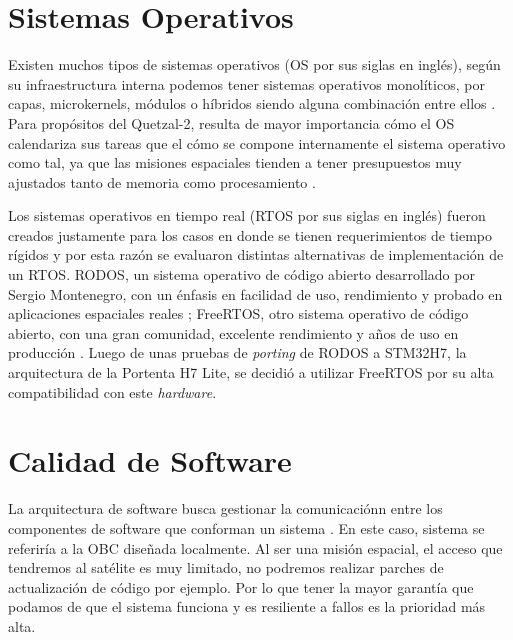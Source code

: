   \section{Sistemas Operativos}
  Existen muchos tipos de sistemas operativos (OS por sus siglas en inglés), según su infraestructura interna podemos tener sistemas operativos monolíticos, por capas, microkernels, módulos o híbridos siendo alguna combinación entre ellos \cite{operating_system_concepts_2018}. Para propósitos del Quetzal-2, resulta de mayor importancia cómo el OS calendariza sus tareas que el cómo se compone internamente el sistema operativo como tal, ya que las misiones espaciales tienden a tener presupuestos muy ajustados tanto de memoria como procesamiento \cite{lwabanji_wilkinson_biermann_bellville_2013}. 

  Los sistemas operativos en tiempo real (RTOS por sus siglas en inglés) fueron creados justamente para los casos en donde se tienen requerimientos de tiempo rígidos \cite{operating_system_concepts_2018} y por esta razón se evaluaron distintas alternativas de implementación de un RTOS. RODOS, un sistema operativo de código abierto desarrollado por Sergio Montenegro, con un énfasis en facilidad de uso, rendimiento y probado en aplicaciones espaciales reales \cite{rodos}; FreeRTOS, otro sistema operativo de código abierto, con una gran comunidad, excelente rendimiento y años de uso en producción \cite{freertos_2010}. Luego de unas pruebas de \textit{porting} de RODOS a STM32H7, la arquitectura de la Portenta H7 Lite, se decidió a utilizar FreeRTOS por su alta compatibilidad con este \textit{hardware}.

  \section{Calidad de Software}
  La arquitectura de software busca gestionar la comunicaciónn entre los componentes de software que conforman un sistema \cite{pareja2019arquitectura}. En este caso, sistema se referiría a la OBC diseñada localmente. Al ser una misión espacial, el acceso que tendremos al satélite es muy limitado, no podremos realizar parches de actualización de código por ejemplo. Por lo que tener la mayor garantía que podamos de que el sistema funciona y es resiliente a fallos es la prioridad más alta.

